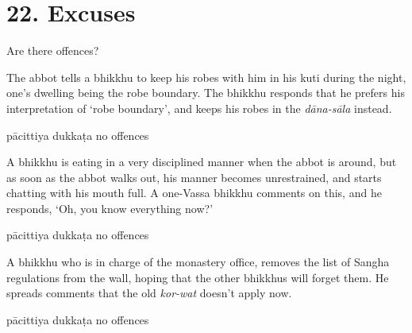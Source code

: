 \chapter{22. Excuses}
\renewcommand*{\theChapterTitle}{22. Excuses}

\begin{exam}{\autoExamName}

  \begin{problem*}

    Are there offences?

    \begin{parts}

      \item The abbot tells a bhikkhu to keep his robes with him in his kuti
      during the night, one's dwelling being the robe boundary. The bhikkhu
      responds that he prefers his interpretation of `robe boundary', and keeps
      his robes in the \emph{dāna-sāla} instead.

      \bigskip

      \begin{answers}{3}
        \bChoices
         pācittiya\eAns
         dukkaṭa\eAns
         no offences\eAns
        \eChoices
      \end{answers}

      \bigskip

      \item A bhikkhu is eating in a very disciplined manner when the abbot is
      around, but as soon as the abbot walks out, his manner becomes
      unrestrained, and starts chatting with his mouth full. A one-Vassa bhikkhu
      comments on this, and he responds, `Oh, you know everything now?'

      \bigskip

      \begin{answers}{3}
        \bChoices
         pācittiya\eAns
         dukkaṭa\eAns
         no offences\eAns
        \eChoices
      \end{answers}

      \bigskip

      \item A bhikkhu who is in charge of the monastery office, removes the list
      of Sangha regulations from the wall, hoping that the other bhikkhus will
      forget them. He spreads comments that the old \emph{kor-wat} doesn't apply now.

      \bigskip

      \begin{answers}{3}
        \bChoices
         pācittiya\eAns
         dukkaṭa\eAns
         no offences\eAns
        \eChoices
      \end{answers}


\end{parts}
\end{problem*}
\end{exam}
